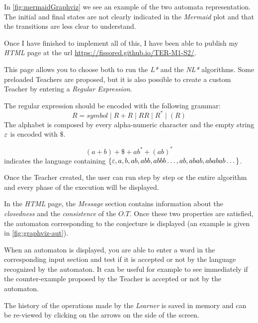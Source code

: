 In \cref{fig:mermaidGraphviz} we see an example of the two automata representation. The initial and final states are not clearly indicated in the \textit{Mermaid} plot and that the transitions are less clear to understand.

Once I have finished to implement all of this, I have been able to publish my \textit{HTML} page at the url \url{https://fissored.github.io/TER-M1-S2/}.

This page allows you to choose both to run the \textit{L*} and the \textit{NL*} algorithms. Some preloaded Teachers are proposed, but it is also possible to create a custom Teacher by entering a \textit{Regular Expression}.

The regular expression should be encoded with the following grammar:
\[ R = symbol \mid R + R \mid RR \mid R^* \mid(R) \]
The alphabet is composed by every alpha-numeric character and the empty string $\varepsilon$ is encoded with $\$$.

\begin{example}
  \[(a + b)+\$+ab^*+(ab)^*\] indicates the language containing $\{\varepsilon,a, b,  ab, abb, abbb\dots, ab, abab, ababab\dots\}$.
\end{example}

Once the Teacher created, the user can run step by step or the entire algorithm and every phase of the execution will be displayed.

In the \textit{HTML} page, the \textit{Message} section contains information about the \textit{closedness} and the \textit{consistence} of the $O.T$. Once these two properties are satisfied, the automaton corresponding to the conjecture is displayed (an example is given in \cref{fig:graphviz-aut}).

When an automaton is displayed, you are able to enter a word in the corresponding input section and test if it is accepted or not by the language recognized by the automaton. It can be useful for example to see immediately if the counter-example proposed by the Teacher is accepted or not by the automaton.

The history of the operations made by the \textit{Learner} is saved in memory and can be re-viewed by clicking on the arrows on the side of the screen.